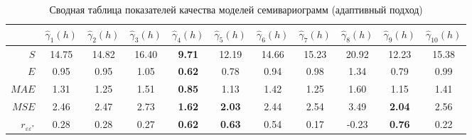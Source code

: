 \begin{table}[ht]
\centering
\caption{Сводная таблица показателей качества моделей семивариограмм (адаптивный подход)} 
\label{table:summary-adapt}
{\footnotesize
\begin{tabular}{r|cccccccccc}
  \hline
 & $ \widehat{\gamma}_1(h) $ & $ \widehat{\gamma}_2(h) $ & $ \widehat{\gamma}_3(h) $ & \boldmath$ \widehat{\gamma}_4(h) $ & $ \widehat{\gamma}_5(h) $ & $ \widehat{\gamma}_6(h) $ & $ \widehat{\gamma}_7(h) $ & $ \widehat{\gamma}_8(h) $ & $ \widehat{\gamma}_9(h) $ & $ \widehat{\gamma}_{10}(h) $ \\ 
  \hline
  $ S $   & 14.75 & 14.82 & 16.40 & \textbf{9.71} & 12.19 & 14.66 & 15.23 & 20.92 & 12.23 & 15.38 \\ 
  $ E $   & 0.95 & 0.95 & 1.05 & \textbf{0.62} & 0.78 & 0.94 & 0.98 & 1.34 & 0.79 & 0.99 \\ 
  $ MAE $ & 1.31 & 1.25 & 1.51 & \textbf{0.85} & 1.13 & 1.42 & 1.25 & 1.60 & 1.15 & 1.41 \\ 
  $ MSE $ & 2.46 & 2.47 & 2.73 & \textbf{1.62} & \textbf{2.03} & 2.44 & 2.54 & 3.49 & \textbf{2.04} & 2.56 \\ 
  $ r_{\varepsilon\varepsilon^{*}} $ & 0.28 & 0.28 & 0.27 & \textbf{0.62} & \textbf{0.63} & 0.54 & 0.17 & -0.23 & \textbf{0.76} & 0.22 \\ 
   \hline
\end{tabular}
}
\end{table}
